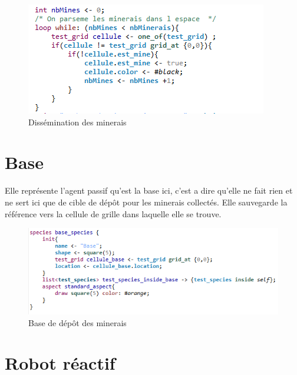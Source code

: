 \begin{figure}[!h]
	\begin{center}
		\includegraphics{code/minerais}
	\end{center}
	\caption{Dissémination des minerais}
\end{figure}

\newpage

\section{Base}

Elle représente l’agent passif qu’est la base ici, c’est a dire qu’elle ne fait rien et ne sert ici que de cible de dépôt pour les minerais collectés. Elle sauvegarde la référence vers la cellule de grille dans laquelle elle se trouve. 

\begin{figure}[!h]
	\begin{center}
		\includegraphics{code/base}
	\end{center}
	\caption{Base de dépôt des minerais}
\end{figure}

\section{Robot réactif}

